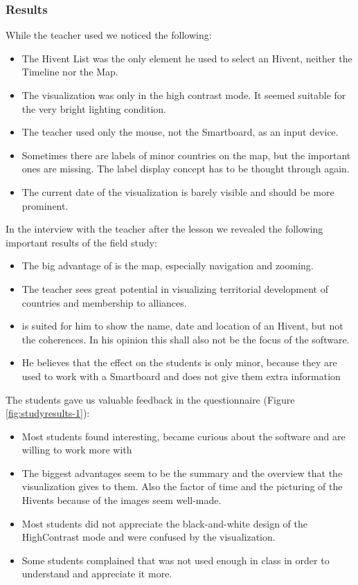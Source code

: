 
\subsubsection{Results} %
\label{sub:results-1}

While the teacher used \HG we noticed the following:

\begin{itemize}
  \item The Hivent List was the only element he used to select an Hivent, neither the Timeline nor the Map.
  \item The visualization was only in the high contrast mode. It seemed suitable for the very bright lighting condition.
  \item The teacher used only the mouse, not the Smartboard, as an input device.
  \item Sometimes there are labels of minor countries on the map, but the important ones are missing. The label display concept has to be thought through again.
  \item The current date of the visualization is barely visible and should be more prominent.
\end{itemize}

In the interview with the teacher after the lesson we revealed the following important results of the field study:

\begin{itemize}
  \item The big advantage of \HG is the map, especially navigation and zooming.
  \item The teacher sees great potential in visualizing territorial development of countries and membership to alliances.
  \item \HG is suited for him to show the name, date and location of an Hivent, but not the coherences. In his opinion this shall also not be the focus of the software.
  \item He believes that the effect on the students is only minor, because they are used to work with a Smartboard and \HG does not give them extra information
\end{itemize}

The students gave us valuable feedback in the questionnaire (Figure \ref{fig:studyresults-1}):

\begin{itemize}
  \item Most students found \HG interesting, became curious about the software and are willing to work more with \HG
  \item The biggest advantages seem to be the summary and the overview that the visualization gives to them. Also the factor of time and the picturing of the Hivents because of the images seem well-made.
  \item Most students did not appreciate the black-and-white design of the HighContrast mode and were confused by the visualization.
  \item Some students complained that \HG was not used enough in class in order to understand and appreciate it more.
\end{itemize}

